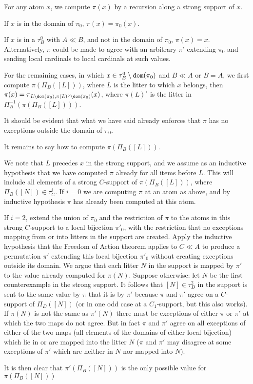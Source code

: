 \documentclass{slides}
\begin{document}
\begin{slide}

For any atom $x$, we compute $\pi(x)$ by a recursion along a strong support of $x$. 

If $x$ is in the domain of $\pi_0$, $\pi(x) = \pi_0(x)$.

If $x$ is in a $\tau^0_B$ with $A \ll B$, and not in the domain of $\pi_0$, $\pi(x)=x$.  Alternatively, $\pi$ could be made to agree with an arbitrary $\pi'$ extending $\pi_0$ and sending local cardinals to local cardinals at such values.

For the remaining cases, in which $x \in \tau^0_B \setminus {\tt dom}(\pi_0)$ and $B \ll A$ or $B=A$, we first compute $\pi(\Pi_B([L]))$, where $L$ is the litter to which $x$ belongs,
then $\pi(x) = \pi_{L \setminus {\tt dom}(\pi_0),\pi(L)^\circ \setminus {\tt dom}(\pi_0)}(x)$, where $\pi(L)^\circ$ is the litter in $\Pi_B^{-1}(\pi(\Pi_B([L])))$.

It should be evident that what we have said already enforces that $\pi$ has no exceptions outside the domain of $\pi_0$.

It remains to say how to compute $\pi(\Pi_B([L]))$.

We note that $L$ precedes $x$ in the strong support, and we assume as an inductive hypothesis that we have computed $\pi$ already for all items before $L$.
This will include all elements of a strong $C$-support of $\pi(\Pi_B([L]))$, where $\Pi_B([N]) \in \tau^i_C$.  If $i=0$ we are computing $\pi$ at an atom as above, and
by inductive hypothesis $\pi$ has already been computed at this atom.

If $i=2$, extend the union of $\pi_0$ and the restriction of $\pi$ to the atoms in this strong $C$-support to a local bijection $\pi'_0$, with the restriction
that no exceptions mapping from or into litters in the support are created.  Apply the inductive hypothesis that the Freedom of Action theorem applies to $C\ll A$ to produce
a permutation $\pi'$ extending this local bijection $\pi'_0$ without creating exceptions outside its domain.   We argue that each litter $N$ in the support is mapped by $\pi'$ to the value
already computed for $\pi(N)$.  Suppose otherwise:  let $N$ be the first counterexample in the strong support.  It follows that $[N]\in \tau^2_D$ in the support is sent to the same value by $\pi$ that it is by $\pi'$ because $\pi$ and $\pi'$ agree on a $C$-support of $\Pi_D([N])$ (or in one odd case at a $C_1$-support, but this also works).  If $\pi(N)$ is not the same as $\pi'(N)$ there must be exceptions of either $\pi$ or $\pi'$ at which the two maps do not agree.  But in fact $\pi$ and $\pi'$ agree on all exceptions of either of the two maps (all elements of the domains of either local bijection) which lie in or are mapped into the litter $N$ ($\pi$ and $\pi'$ may disagree at some exceptions of $\pi'$ which are neither in $N$ nor mapped into $N$).

It is then clear that $\pi'(\Pi_B([N]))$ is the only possible value for  $\pi(\Pi_B([N]))$

\end{slide}
\end{document}

